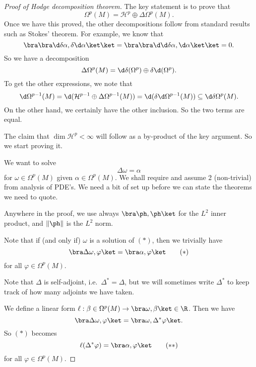 \documentclass[a4paper]{article}
\begin{document}
\begin{proof}[Proof of Hodge decomposition theorem]
  The key statement is to prove that
  \[
    \Omega^p(M) = \mathcal{H}^p \oplus \Delta \Omega^p(M).
  \]
  Once we have this proved, the other decompositions follow from standard results such as Stokes' theorem. For example, we know that
  \[
    \bra \bra \d \delta \alpha, \delta \d \alpha \ket \ket = \bra \bra \d \d \delta \alpha, \d \alpha\ket\ket = 0.
  \]
  So we have a decomposition
  \[
    \Delta \Omega^p(M) = \d \delta (\Omega^p) \oplus \delta \d (\Omega^p).
  \]
  To get the other expressions, we note that
  \[
    \d \Omega^{p - 1}(M) = \d (\mathcal{H}^{p - 1} \oplus \Delta \Omega^{p - 1}(M)) = \d (\delta \d \Omega^{p - 1}(M)) \subseteq \d \delta \Omega^p(M).
  \]
  On the other hand, we certainly have the other inclusion. So the two terms are equal.

  The claim that $\dim \mathcal{H}^p < \infty$ will follow as a by-product of the key argument. So we start proving it.

  We want to solve
  \[
    \Delta \omega = \alpha\tag{$\dagger$}
  \]
  for $\omega \in \Omega^p(M)$ given $\alpha \in \Omega^p(M)$. We shall require and assume 2 (non-trivial) from analysis of PDE's. We need a bit of set up before we can state the theorems we need to quote.

  Anywhere in the proof, we use always $\bra \ph, \ph\ket$ for the $L^2$ inner product, and $\|\ph\|$ is the $L^2$ norm.

  Note that if (and only if) $\omega$ is a solution of $(*)$, then we trivially have
  \[
    \bra \Delta \omega, \varphi\ket = \bra \alpha, \varphi\ket\tag{$*$}
  \]
  for all $\varphi \in \Omega^p(M)$.

  Note that $\Delta$ is self-adjoint, i.e.\ $\Delta^* = \Delta$, but we will sometimes write $\Delta^*$ to keep track of how many adjoints we have taken.

  We define a linear form $\ell: \beta \in \Omega^p(M) \to \bra \omega, \beta\ket \in \R$. Then we have
  \[
    \bra \Delta \omega, \varphi\ket = \bra \omega, \Delta^* \varphi\ket.
  \]
  So $(*)$ becomes
  \[
    \ell(\Delta^* \varphi) = \bra \alpha, \varphi\ket \tag{$**$}
  \]
  for all $\varphi \in \Omega^p(M)$.


\end{proof}
\end{document}
